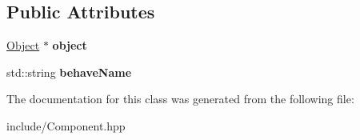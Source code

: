\subsection*{Public Attributes}
\begin{DoxyCompactItemize}
\item 
\hypertarget{class_component_a2aa0e777f7b39ffc4e57b04fdf6293e7}{\hyperlink{class_object}{Object} $\ast$ {\bfseries object}}\label{class_component_a2aa0e777f7b39ffc4e57b04fdf6293e7}

\item 
\hypertarget{class_component_a66faf1a4d8e3367ae90d3584d0a4b874}{std\-::string {\bfseries behave\-Name}}\label{class_component_a66faf1a4d8e3367ae90d3584d0a4b874}

\end{DoxyCompactItemize}


The documentation for this class was generated from the following file\-:\begin{DoxyCompactItemize}
\item 
include/Component.\-hpp\end{DoxyCompactItemize}
